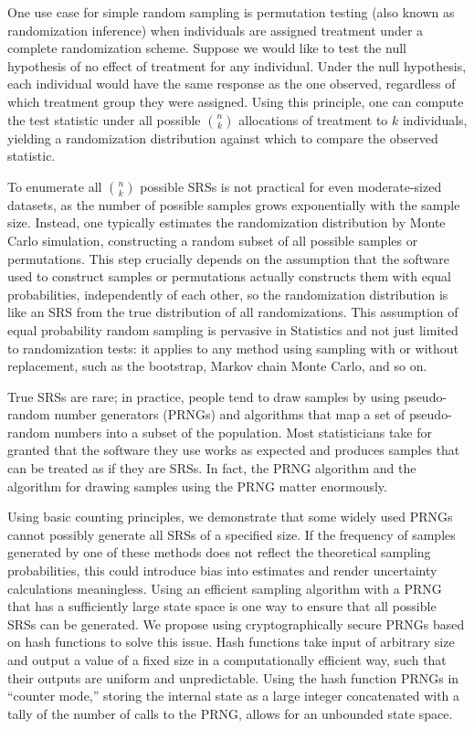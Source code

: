 \documentclass[12pt]{article}
\begin{document}
One use case for simple random sampling is permutation testing (also known as randomization inference) when individuals are assigned treatment under a complete randomization scheme.
Suppose we would like to test the null hypothesis of no effect of treatment for any individual.
Under the null hypothesis, each individual would have the same response as the one observed, regardless of which treatment group they were assigned.
Using this principle, one can compute the test statistic under all possible $n \choose k$ allocations of treatment to $k$ individuals, yielding a randomization distribution against which to compare the observed statistic.

To enumerate all $n \choose k$ possible SRSs is not practical for even moderate-sized datasets, as the number of possible samples grows exponentially with the sample size.
Instead, one typically estimates the randomization distribution by Monte Carlo simulation, constructing a random subset of all possible samples or permutations.
This step crucially depends on the assumption that the software used to construct samples or permutations actually constructs them with equal probabilities, independently of each other, 
so the randomization distribution is like an SRS from the true distribution of all randomizations.
This assumption of equal probability random sampling is pervasive in Statistics and not just limited to randomization tests:
it applies to any method using sampling with or without replacement, such as the bootstrap, Markov chain Monte Carlo, and so on.

True SRSs are rare; in practice, people tend to draw samples by using pseudo-random number generators 
(PRNGs) and algorithms that map a set of pseudo-random numbers into a subset of the population. 
Most statisticians take for granted that the software they use works as expected and
produces samples that can be treated as if they are SRSs.
In fact, the PRNG algorithm and the algorithm for drawing samples using the PRNG matter enormously.

Using basic counting principles, we demonstrate that some widely used PRNGs cannot possibly generate all SRSs of a specified size.
If the frequency of samples generated by one of these methods does not reflect the theoretical sampling probabilities, this could introduce bias into estimates and render uncertainty calculations meaningless.
Using an efficient sampling algorithm with a PRNG that has a sufficiently large state space is one way to ensure that all possible SRSs can be generated.
We propose using cryptographically secure PRNGs based on hash functions to solve this issue.
Hash functions take input of arbitrary size and output a value of a fixed size in a computationally efficient way,
such that their outputs are uniform and unpredictable.
Using the hash function PRNGs in ``counter mode,'' storing the internal state as a large integer concatenated with a tally of the number of calls to the PRNG, allows for an unbounded state space.
\end{document}
